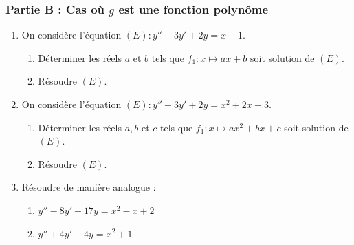 \documentclass[12pt,a4paper]{article}
\begin{document}
\subsubsection*{Partie B : Cas où $g$ est une fonction polynôme}
\begin{enumerate}
    \item On considère l'équation $(E) : y'' - 3y' + 2y = x + 1.$
    \begin{enumerate}[label=\alph*)]
        \item Déterminer les réels $a$ et $b$ tels que $f_{1} : x \mapsto ax + b$ soit solution de $(E)$.
        \item Résoudre $(E)$.
    \end{enumerate}
    \item On considère l'équation $(E) : y'' - 3y' + 2y = x^{2} + 2x + 3.$
    \begin{enumerate}[label=\alph*)]
        \item Déterminer les réels $a, b$ et $c$ tels que $f_{1} : x \mapsto ax^{2} + bx + c$ soit solution de $(E)$.
        \item Résoudre $(E)$.
    \end{enumerate}
    \item Résoudre de manière analogue :
    \begin{enumerate}[label=\alph*)]
        \item $y'' - 8y' + 17y = x^{2} - x + 2$
        \item $y'' + 4y' + 4y = x^{2} + 1$
    \end{enumerate}
\end{enumerate}
\end{document}
